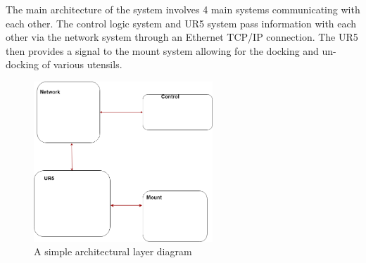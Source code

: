 The main architecture of the system involves 4 main systems communicating with each other. The control logic system and UR5 system pass information with each other via the network system through an Ethernet TCP/IP connection.  The UR5 then provides a signal to the mount system allowing for the docking and un-docking of various utensils.

\begin{figure}[h!]
	\centering
 	\includegraphics[width=0.60\textwidth]{images/ADS_layers}
 \caption{A simple architectural layer diagram}
\end{figure}